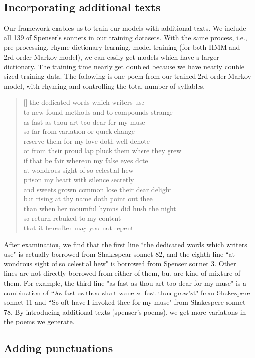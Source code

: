 \subsection{Incorporating additional texts} \label{sec:additionaltext}
Our framework enables us to train our models with additional texts. We include all 139 of Spenser's sonnets in our training datasets. With the same process, i.e., pre-processing, rhyme dictionary learning, model training (for both HMM and 2rd-order Markov model), we can easily get models which have a larger dictionary. The training time nearly get doubled because we have nearly double sized training data. The following is one poem from our trained 2rd-order Markov model, with rhyming and controlling-the-total-number-of-syllables.
\settowidth{\versewidth}{even  see  shall  accessary  used  must  find  and  herself  enfeebled  mine  it}
\begin{verse}[\versewidth]
 the  dedicated  words  which  writers  use \\
 to  new  found  methods  and  to  compounds  strange \\
 as  fast  as  thou  art  too  dear  for  my  muse \\
 so  far  from  variation  or  quick  change \\
 reserve  them  for  my  love  doth  well  denote \\
 or  from  their  proud  lap  pluck  them  where  they  grew \\
 if  that  be  fair  whereon  my  false  eyes  dote \\
 at  wondrous  sight  of  so  celestial  hew \\
 prison  my  heart  with  silence  secretly \\
 and  sweets  grown  common  lose  their  dear  delight \\
 but  rising  at  thy  name  doth  point  out  thee \\
 than  when  her  mournful  hymns  did  hush  the  night \\
 \vin so  return  rebuked  to  my  content \\
 \vin that  it  hereafter  may  you  not  repent
\end{verse}

After examination, we find that the first line ``the  dedicated  words  which  writers  use" is actually borrowed from Shakespear sonnet 82, and the eighth line ``at  wondrous  sight  of  so  celestial  hew" is borrowed from Spenser sonnet 3. Other lines are not directly borrowed from either of them, but are kind of mixture of them. For example, the third line "as  fast  as  thou  art  too  dear  for  my  muse" is a combination of  ``As fast as thou shalt wane so fast thou grow'st" from Shakespere sonnet 11 and ``So oft have I invoked thee for my muse" from Shakespere sonnet 78. By introducing additional texts (spenser's poems), we get more variations in the poems we generate.

\subsection{Adding punctuations}\label{sec:punctuations}


